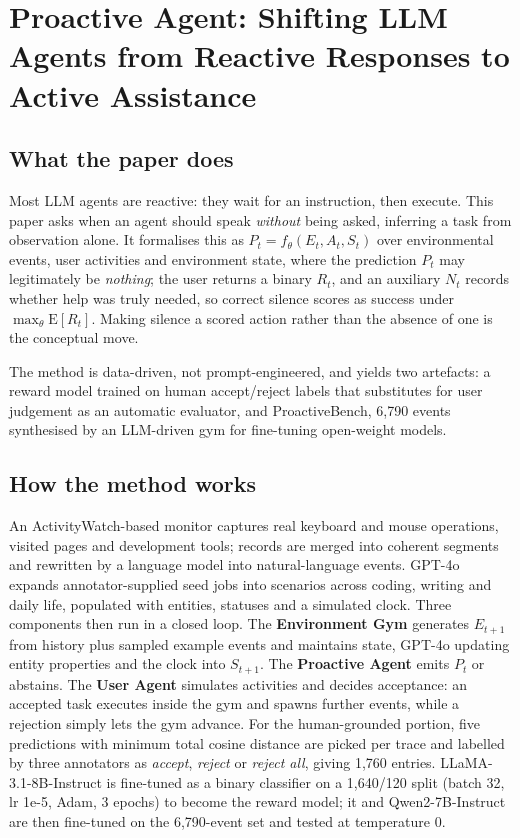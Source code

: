 \section{Proactive Agent: Shifting LLM Agents from Reactive Responses to Active Assistance}

\subsection{What the paper does}

Most LLM agents are reactive: they wait for an instruction, then execute. This paper asks when an agent should speak \emph{without} being asked, inferring a task from observation alone. It formalises this as $P_t=f_\theta(E_t,A_t,S_t)$ over environmental events, user activities and environment state, where the prediction $P_t$ may legitimately be \emph{nothing}; the user returns a binary $R_t$, and an auxiliary $N_t$ records whether help was truly needed, so correct silence scores as success under $\max_\theta \mathrm{E}[R_t]$. Making silence a scored action rather than the absence of one is the conceptual move.

The method is data-driven, not prompt-engineered, and yields two artefacts: a reward model trained on human accept/reject labels that substitutes for user judgement as an automatic evaluator, and ProactiveBench, 6,790 events synthesised by an LLM-driven gym for fine-tuning open-weight models.

\subsection{How the method works}

An ActivityWatch-based monitor captures real keyboard and mouse operations, visited pages and development tools; records are merged into coherent segments and rewritten by a language model into natural-language events. GPT-4o expands annotator-supplied seed jobs into scenarios across coding, writing and daily life, populated with entities, statuses and a simulated clock. Three components then run in a closed loop. The \textbf{Environment Gym} generates $E_{t+1}$ from history plus sampled example events and maintains state, GPT-4o updating entity properties and the clock into $S_{t+1}$. The \textbf{Proactive Agent} emits $P_t$ or abstains. The \textbf{User Agent} simulates activities and decides acceptance: an accepted task executes inside the gym and spawns further events, while a rejection simply lets the gym advance. For the human-grounded portion, five predictions with minimum total cosine distance are picked per trace and labelled by three annotators as \emph{accept}, \emph{reject} or \emph{reject all}, giving 1,760 entries. LLaMA-3.1-8B-Instruct is fine-tuned as a binary classifier on a 1,640/120 split (batch 32, lr 1e-5, Adam, 3 epochs) to become the reward model; it and Qwen2-7B-Instruct are then fine-tuned on the 6,790-event set and tested at temperature 0.

